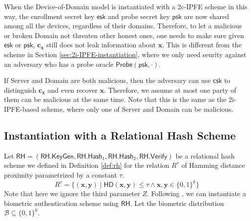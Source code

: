 When the Device-of-Domain model is instantiated with a 2c-IPFE scheme in this way, the enrollment secret key $\textsf{esk}$ and probe secret key $\textsf{psk}$ are now shared among all the devices, regardless of their domains. Therefore, to let a malicious or broken \textsf{Domain} not threaten other honest ones, one needs to make sure given $\textsf{esk}$ or $\textsf{psk}$, $\mathbf{c_x}$ still does not leak information about $\mathbf{x}$. This is different from the scheme in Section \ref{sec:2i-IPFE-instantiation}, where we only need seurity against an adversary who has a probe oracle $\textsf{Probe}(\textsf{psk}, \cdot)$.

If \textsf{Server} and \textsf{Domain} are both malicious, then the adversary can use $\textsf{csk}$ to distinguish $\mathbf{c_x}$ and even recover $\mathbf{x}$. Therefore, we assume at most one party of them can be malicious at the same time. Note that this is the same as the 2i-IPFE-based scheme, where only one of \textsf{Server} and \textsf{Domain} can be malicious.


\subsection{Instantiation with a Relational Hash Scheme}
\label{sec:rh-instantiation}

Let $\textsf{RH} = (\textsf{RH.KeyGen}, \textsf{RH.Hash}_1, \textsf{RH.Hash}_2, \textsf{RH.Verify})$ be a relational hash scheme we defined in Definition \ref{def:rh} for the relation $R^\tau$ of Hamming distance proximity parametrized by a constant $\tau$.
\[
	R^\tau = \{ (\mathbf{x}, \mathbf{y}) \mid \textsf{HD}(\mathbf{x}, \mathbf{y}) \leq \tau \wedge \mathbf{x}, \mathbf{y} \in \{0,1\}^k \}
\]
Note that here we ignore the third parameter $Z$.
Following \cite{cryptoeprint:2014/394}, we can instantiate a biometric authentication scheme using $\textsf{RH}$.  Let the biometric distribution $\mathcal{B} \subseteq \{0,1\}^k$.

